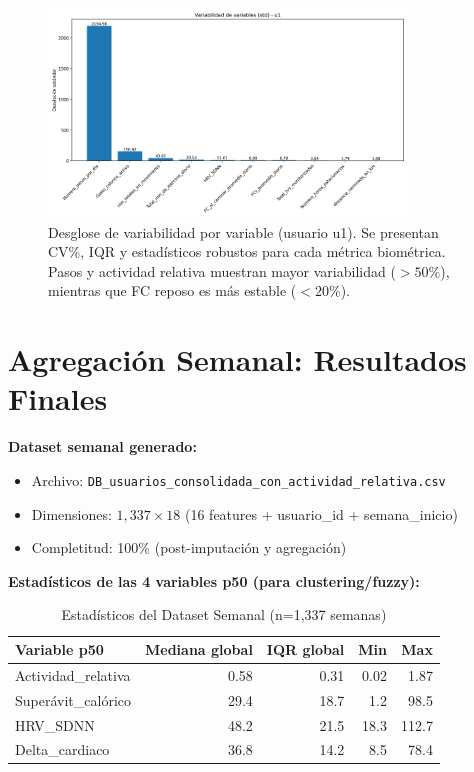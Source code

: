 \documentclass[12pt,letterpaper,twoside]{report}
\begin{document}
\begin{figure}[htbp]
\centering
\includegraphics[width=0.85\textwidth]{../analisis_u/variabilidad/variabilidad_variables_u1.png}
\caption{Desglose de variabilidad por variable (usuario u1). Se presentan CV\%, IQR y estadísticos robustos para cada métrica biométrica. Pasos y actividad relativa muestran mayor variabilidad ($>50\%$), mientras que FC reposo es más estable ($<20\%$).}
\label{fig:variabilidad_u1}
\end{figure}

\section{Agregación Semanal: Resultados Finales}

\begin{calculobox}
\textbf{Dataset semanal generado:}

\begin{itemize}[noitemsep]
    \item Archivo: \texttt{DB\_usuarios\_consolidada\_con\_actividad\_relativa.csv}
    \item Dimensiones: $1,337 \times 18$ (16 features + usuario\_id + semana\_inicio)
    \item Completitud: 100\% (post-imputación y agregación)
\end{itemize}

\textbf{Estadísticos de las 4 variables p50 (para clustering/fuzzy):}

\begin{table}[H]
\centering
\begin{tabular}{@{}lrrrr@{}}
\toprule
\textbf{Variable p50} & \textbf{Mediana global} & \textbf{IQR global} & \textbf{Min} & \textbf{Max} \\
\midrule
Actividad\_relativa     & 0.58 & 0.31 & 0.02 & 1.87 \\
Superávit\_calórico     & 29.4 & 18.7 & 1.2  & 98.5 \\
HRV\_SDNN               & 48.2 & 21.5 & 18.3 & 112.7 \\
Delta\_cardiaco         & 36.8 & 14.2 & 8.5  & 78.4 \\
\bottomrule
\end{tabular}
\caption{Estadísticos del Dataset Semanal (n=1,337 semanas)}
\label{tab:weekly_stats}
\end{table}
\end{calculobox}
\end{document}
